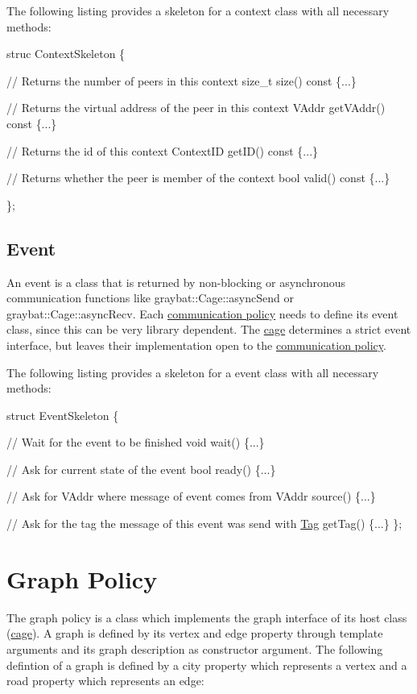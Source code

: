 The following listing provides a skeleton for a context class with all necessary methods\+:


\begin{DoxyCode}
struc ContextSkeleton \{

    \textcolor{comment}{// Returns the number of peers in this context}
    \textcolor{keywordtype}{size\_t} size()\textcolor{keyword}{ const }\{...\}

    \textcolor{comment}{// Returns the virtual address of the peer in this context}
    VAddr getVAddr()\textcolor{keyword}{ const }\{...\}

    \textcolor{comment}{// Returns the id of this context}
    ContextID getID()\textcolor{keyword}{ const }\{...\}

    \textcolor{comment}{// Returns whether the peer is member of the context}
    \textcolor{keywordtype}{bool} valid()\textcolor{keyword}{ const }\{...\}

\};
\end{DoxyCode}
 \hypertarget{event}{}\subsection{Event}\label{event}
An event is a class that is returned by non-\/blocking or asynchronous communication functions like graybat\+::\+Cage\+::async\+Send or graybat\+::\+Cage\+::async\+Recv. Each \hyperlink{communicationPolicy}{communication policy} needs to define its event class, since this can be very library dependent. The \hyperlink{cage}{cage} determines a strict event interface, but leaves their implementation open to the \hyperlink{communicationPolicy}{communication policy}.

The following listing provides a skeleton for a event class with all necessary methods\+:


\begin{DoxyCode}
\textcolor{keyword}{struct }EventSkeleton \{

    \textcolor{comment}{// Wait for the event to be finished}
    \textcolor{keywordtype}{void} wait() \{...\}

    \textcolor{comment}{// Ask for current state of the event}
    \textcolor{keywordtype}{bool} ready() \{...\}

        \textcolor{comment}{// Ask for VAddr where message of event comes from}
        VAddr source() \{...\}

        \textcolor{comment}{// Ask for the tag the message of this event was send with}
        \hyperlink{structTag}{Tag} getTag() \{...\}
\};
\end{DoxyCode}
 \hypertarget{graphPolicy}{}\section{Graph Policy}\label{graphPolicy}
The graph policy is a class which implements the graph interface of its host class (\hyperlink{cage}{cage}). A graph is defined by its vertex and edge property through template arguments and its graph description as constructor argument. The following defintion of a graph is defined by a city property which represents a vertex and a road property which represents an edge\+:


